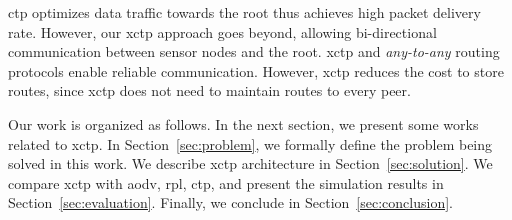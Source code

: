 \ac{ctp} optimizes data traffic towards the root thus achieves high packet delivery rate. However, our \ac{xctp} approach goes beyond, allowing bi-directional communication between sensor nodes and the root. \ac{xctp} and \textit{any-to-any} routing protocols enable reliable communication. However, \ac{xctp} reduces the cost to store routes, since \ac{xctp} does not need to maintain routes to every peer.

Our work is organized as follows. In the next section, we present some works related to \ac{xctp}. In Section~\ref{sec:problem}, we formally define the problem being solved in this work. We describe \ac{xctp} architecture in Section~\ref{sec:solution}. We compare \ac{xctp} with \ac{aodv}, \ac{rpl}, \ac{ctp}, and present the simulation results in Section~\ref{sec:evaluation}. Finally, we conclude in Section~\ref{sec:conclusion}.
